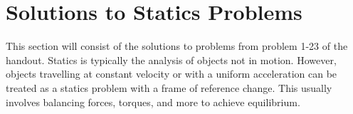 \documentclass[a4paper,11pt]{article}
\begin{document}
\section{Solutions to Statics Problems}

This section will consist of the solutions to problems from problem 1-23 of the handout. Statics is typically the analysis of objects not in motion. However, objects travelling at constant velocity or with a uniform acceleration can be treated as a statics problem with a frame of reference change. This usually involves balancing forces, torques, and more to achieve equilibrium. 


























\end{document}
